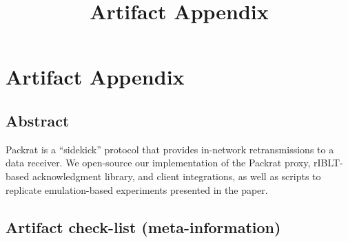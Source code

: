 \documentclass[sigplan,review]{acmart}
\title{Artifact Appendix}
\begin{document}
\appendix
\section{Artifact Appendix}

\subsection{Abstract}

Packrat is a ``sidekick'' protocol that provides in-network retransmissions to a data receiver.
We open-source our implementation of the Packrat proxy, rIBLT-based acknowledgment library, and client integrations, as well as scripts to replicate emulation-based experiments presented in the paper.

\subsection{Artifact check-list (meta-information)}
\end{document}
